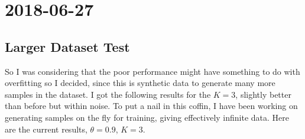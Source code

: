 \documentclass[a4paper]{article}
\newcommand{\DatestampYMD}[3]{\mbox{#1-#2-#3}}
\newcommand{\entry}[3]{\newpage\section*{\DatestampYMD{#1}{#2}{#3}} }
\begin{document}
\entry{2018}{06}{27}
\subsection*{Larger Dataset Test}
So I was considering that the poor performance might have something to do with overfitting so I decided, since this is synthetic data to generate many more samples in the dataset.
I got the following results for the $K=3$, slightly better than before but within noise.
To put a nail in this coffin, I have been working on generating samples on the fly for training, giving effectively infinite data.
Here are the current results, $\theta = 0.9$, $K = 3$.
\begin{figure}[H]
    \begin{minipage}{.45\linewidth}
        \centering
    \end{minipage}
    \begin{minipage}{.45\linewidth}
        \centering

\end{minipage}
\end{figure}
\end{document}
